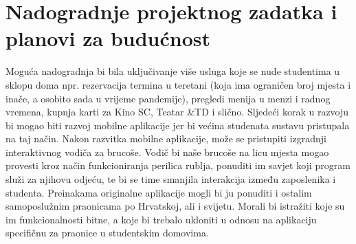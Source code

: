 		\section{Nadogradnje projektnog zadatka i planovi za budućnost}
		
			{Moguća nadogradnja bi bila uključivanje više usluga koje se nude studentima u sklopu doma npr.
			rezervacija termina u teretani (koja ima ograničen broj mjesta i inače, a osobito sada u vrijeme
			pandemije), pregledi menija u menzi i radnog vremena, kupnja karti za Kino SC, Teatar \&TD i slično.
			Sljedeći korak u razvoju bi mogao biti razvoj mobilne aplikacije jer bi većina studenata sustavu pristupala
			na taj način. Nakon razvitka mobilne aplikacije, može se pristupiti izgradnji interaktivnog vodiča za
			brucoše. Vodič bi naše brucoše na licu mjesta mogao provesti kroz način funkcioniranja perilica rublja,
			ponuditi im savjet koji program služi za njihovu odjeću, te bi se time smanjila interakcija između
			zaposlenika i studenta.
			Preinakama originalne aplikacije mogli bi ju ponuditi i ostalim samoposlužnim praonicama po Hrvatskoj,
			ali i svijetu. Morali bi istražiti koje su im funkcionalnosti bitne, a koje bi trebalo ukloniti u odnosu na
			aplikaciju specifičnu za praonice u studentskim domovima.}